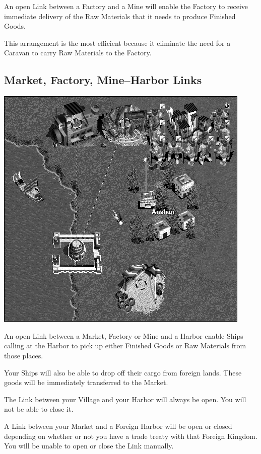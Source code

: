 An open Link between a Factory and a Mine will enable the Factory to receive immediate delivery of the Raw Materials that it needs to produce Finished Goods.

This arrangement is the most efficient because it eliminate the need for a Caravan to carry Raw Materials to the Factory.

\clearpage

\subsection{Market, Factory, Mine–Harbor Links}

\begin{center}
	\includegraphics[width=0.7\linewidth]{Ilink_harbor}
\end{center}

An open Link between a Market, Factory or Mine and a Harbor enable Ships calling at the Harbor to pick up either Finished Goods or Raw Materials from those places.

Your Ships will also be able to drop off their cargo from foreign lands. These goods will be immediately transferred to the Market.

The Link between your Village and your Harbor will always be open. You will not be able to close it.

A Link between your Market and a Foreign Harbor will be open or closed depending on whether or not you have a trade treaty with that Foreign Kingdom. You will be unable to open or close the Link manually.